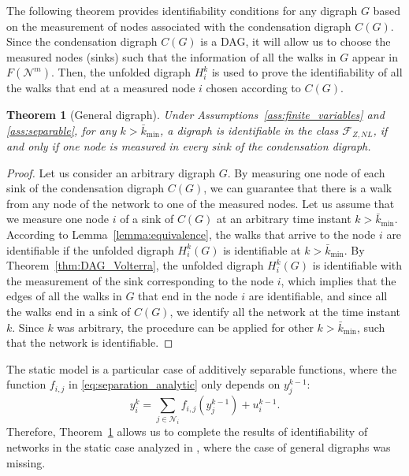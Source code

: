 \documentclass[letterpaper,10pt,journal]{IEEEtran}
\newcommand{\Ftwo}{\mathcal{F}_{Z,NL}}
\newtheorem{theorem}{Theorem}
\newcommand{\NN}{\mathcal{N}}
\begin{document}
The following theorem provides identifiability conditions for any digraph $G$ based on the measurement of nodes associated with the condensation digraph $C(G)$. Since the condensation digraph $C(G)$ is a DAG, it will allow us to choose the measured nodes (sinks) such that the information of all the walks in $G$ appear in $F(\NN^m)$. Then, the unfolded digraph $H_i^k$ is used to prove the identifiability of all the walks that end at a measured node $i$ chosen according to $C(G)$. 

\begin{theorem}[General digraph]\label{thm:general_digraph}
Under Assumptions~\ref{ass:finite_variables} and \ref{ass:separable}, for any $k> \bar k_{\min}$, a digraph is identifiable in the class $\Ftwo$, if and only if one node is measured in every sink of the condensation digraph.
\end{theorem}
\begin{proof}
Let us consider an arbitrary digraph $G$. 
    By measuring one node of each sink of the condensation digraph $C(G)$, we can guarantee that there is a walk from any node of the network to one of the measured nodes. Let us assume that we measure one node $i$ of a sink of $C(G)$ at an arbitrary time instant $k> \bar k_{\min}$. According to Lemma~\ref{lemma:equivalence}, the walks that arrive to the node $i$ are identifiable if the unfolded digraph $H_i^k(G)$ is identifiable at $k>\bar k_{\min}$. By Theorem~\ref{thm:DAG_Volterra}, the unfolded digraph $H_i^k(G)$ is identifiable with the measurement of the sink corresponding to the node $i$, which implies that the edges of all the walks in $G$ that end in the node $i$ are identifiable, and since all the walks end in a sink of $C(G)$, we identify all the network at the time instant $k$. Since $k$ was arbitrary, the procedure can be applied for other $k>\bar k_{\min}$, such that the network is identifiable.
\end{proof}




The static model is a particular case of additively separable functions, where the function $f_{i,j}$  in \eqref{eq:separation_analytic} only depends \linebreak on $y_j^{k-1}$:
\begin{equation}\label{eq:nonlinear_model_static}
y_i^k=\sum_{j\in \mathcal{N}_i}f_{i,j}(y_j^{k-1})+u_i^{k-1}. 
\end{equation}
Therefore, Theorem~\ref{thm:general_digraph} allows us to complete the results of identifiability of networks in the static case analyzed in \cite{vizuete2023nonlinear}, where the case of general digraphs was missing.
\end{document}
